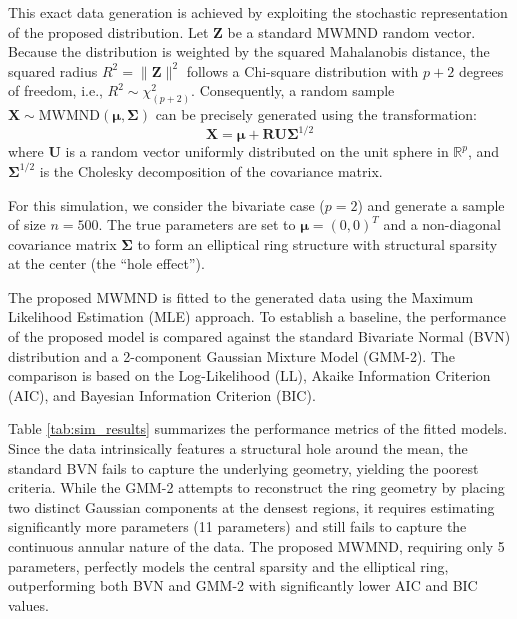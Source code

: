 \documentclass[twoside]{article}
\begin{document}
This exact data generation is achieved by exploiting the stochastic representation of the proposed distribution. Let $\mathbf{Z}$ be a standard MWMND random vector. Because the distribution is weighted by the squared Mahalanobis distance, the squared radius $R^2 = \|\mathbf{Z}\|^2$ follows a Chi-square distribution with $p+2$ degrees of freedom, i.e., $R^2 \sim \chi^2_{(p+2)}$. Consequently, a random sample $\mathbf{X} \sim \text{MWMND}(\boldsymbol{\mu}, \boldsymbol{\Sigma})$ can be precisely generated using the transformation:
\begin{equation}
	\mathbf{X} = \boldsymbol{\mu} + \mathbf{R} \mathbf{U} \boldsymbol{\Sigma}^{1/2}
\end{equation}
where $\mathbf{U}$ is a random vector uniformly distributed on the unit sphere in $\mathbb{R}^p$, and $\boldsymbol{\Sigma}^{1/2}$ is the Cholesky decomposition of the covariance matrix. 

For this simulation, we consider the bivariate case ($p=2$) and generate a sample of size $n=500$. The true parameters are set to $\boldsymbol{\mu} = (0, 0)^T$ and a non-diagonal covariance matrix $\boldsymbol{\Sigma}$ to form an elliptical ring structure with structural sparsity at the center (the ``hole effect''). 

The proposed MWMND is fitted to the generated data using the Maximum Likelihood Estimation (MLE) approach. To establish a baseline, the performance of the proposed model is compared against the standard Bivariate Normal (BVN) distribution and a 2-component Gaussian Mixture Model (GMM-2). The comparison is based on the Log-Likelihood (LL), Akaike Information Criterion (AIC), and Bayesian Information Criterion (BIC).

Table \ref{tab:sim_results} summarizes the performance metrics of the fitted models. Since the data intrinsically features a structural hole around the mean, the standard BVN fails to capture the underlying geometry, yielding the poorest criteria. While the GMM-2 attempts to reconstruct the ring geometry by placing two distinct Gaussian components at the densest regions, it requires estimating significantly more parameters (11 parameters) and still fails to capture the continuous annular nature of the data. The proposed MWMND, requiring only 5 parameters, perfectly models the central sparsity and the elliptical ring, outperforming both BVN and GMM-2 with significantly lower AIC and BIC values.
\end{document}
